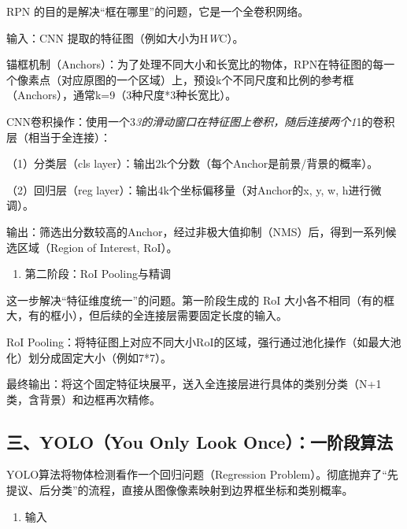 RPN 的目的是解决``框在哪里''的问题，它是一个全卷积网络。

输入：CNN 提取的特征图（例如大小为H\emph{W}C）。

锚框机制（Anchors）：为了处理不同大小和长宽比的物体，RPN在特征图的每一个像素点（对应原图的一个区域）上，预设k个不同尺度和比例的参考框（Anchors），通常k=9（3种尺度*3种长宽比）。

CNN卷积操作：使用一个3\emph{3的滑动窗口在特征图上卷积，随后连接两个1}1的卷积层（相当于全连接）：

（1）分类层（cls layer）：输出2k个分数（每个Anchor是前景/背景的概率）。

（2）回归层（reg layer）：输出4k个坐标偏移量（对Anchor的x, y, w, h进行微调）。

输出：筛选出分数较高的Anchor，经过非极大值抑制（NMS）后，得到一系列候选区域（Region of Interest, RoI）。

\begin{enumerate}
\def\labelenumi{\arabic{enumi}.}
\setcounter{enumi}{1}
\tightlist
\item
  第二阶段：RoI Pooling与精调
\end{enumerate}

这一步解决``特征维度统一''的问题。第一阶段生成的 RoI 大小各不相同（有的框大，有的框小），但后续的全连接层需要固定长度的输入。

RoI Pooling：将特征图上对应不同大小RoI的区域，强行通过池化操作（如最大池化）划分成固定大小（例如7*7）。

最终输出：将这个固定特征块展平，送入全连接层进行具体的类别分类（N+1类，含背景）和边框再次精修。

\hypertarget{ux4e09yoloyou-only-look-onceux4e00ux9636ux6bb5ux7b97ux6cd5}{%
\subsection{三、YOLO（You Only Look Once）：一阶段算法}\label{ux4e09yoloyou-only-look-onceux4e00ux9636ux6bb5ux7b97ux6cd5}}

YOLO算法将物体检测看作一个回归问题（Regression Problem）。彻底抛弃了``先提议、后分类''的流程，直接从图像像素映射到边界框坐标和类别概率。

\begin{enumerate}
\def\labelenumi{\arabic{enumi}.}
\tightlist
\item
  输入
\end{enumerate}

